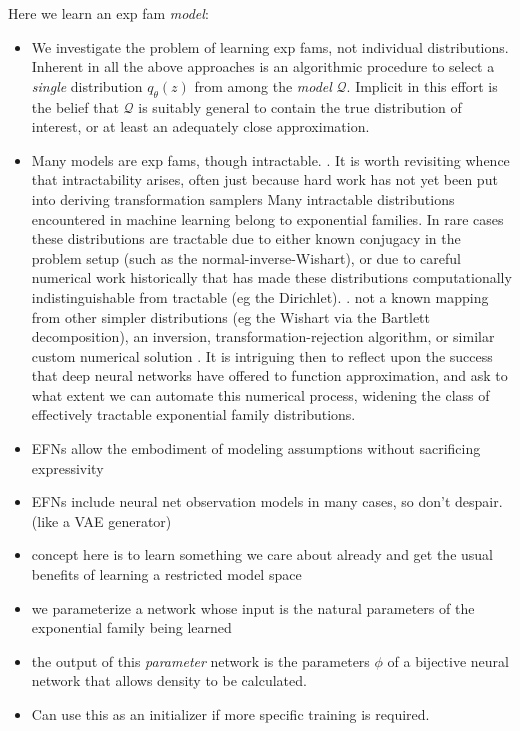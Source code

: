 \documentclass{article}
\begin{document}
Here we learn an exp fam \emph{model}:
\begin{itemize}

\item We investigate the problem of learning exp fams, not individual distributions.  Inherent in all the above approaches is an algorithmic procedure to select a \emph{single} distribution $q_\theta(z)$ from among the \emph{model} $\mathcal{Q}$.  Implicit in this effort is the belief that $\mathcal{Q}$ is suitably general to contain the true distribution of interest, or at least an adequately close approximation.

\item Many models are exp fams, though intractable.  \cite{wainwright2008graphical}.   It is worth revisiting whence that intractability arises, often just because hard work has not yet been put into deriving transformation samplers Many intractable distributions encountered in machine learning belong to exponential families.  In rare cases these distributions are tractable due to either known conjugacy in the problem setup (such as the normal-inverse-Wishart), or due to careful numerical work historically that has made these distributions computationally indistinguishable from tractable (eg the Dirichlet). \cite{Devroye:1986aa}.  not a known mapping from other simpler distributions (eg the Wishart via the Bartlett decomposition), an inversion, transformation-rejection algorithm, or similar custom numerical solution \cite{Devroye:1986aa}.  It is intriguing then to reflect upon the success that deep neural networks have offered to function approximation, and ask to what extent we can automate this numerical process, widening the class of effectively tractable exponential family distributions.
\item EFNs allow the embodiment of modeling assumptions without sacrificing expressivity
\item EFNs include neural net observation models in many cases, so don't despair. (like a VAE generator)
\item concept here is to learn something we care about already and get the usual benefits of learning a restricted model space \cite[\S7, for example]{friedman2001elements}
\item we parameterize a network whose input is the natural parameters of the exponential family being learned
\item the output of this \emph{parameter} network is the parameters $\phi$ of a bijective neural network that allows density to be calculated.  
\item Can use this as an initializer if more specific training is required.
\end{itemize}
\end{document}
